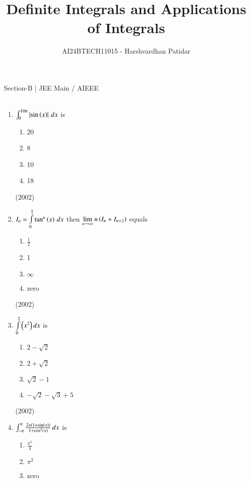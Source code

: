 \documentclass[journal,12pt,twocolumn]{IEEEtran}
\theoremstyle{remark}
\begin{document}

\vspace{3cm}

\title{Definite Integrals and Applications of Integrals}
\author{AI24BTECH11015 - Harshvardhan Patidar}
\maketitle
\newpage
\bigskip

\renewcommand{\thefigure}{\theenumi}
\renewcommand{\thetable}{\theenumi}



Section-B | JEE Main / AIEEE \\ \\
\begin{enumerate}
	\item 
		$\int_0^{10\pi} \left\vert\sin \left(x\right)\right\vert \, dx$ is  
		\begin{enumerate}
			\item 20\item 8\item 10\item 18
		\end{enumerate} 
		\hfill (2002)
	\item
		$I_n = \int \limits_{0}^{\frac{\pi}{4}} \tan^n \left(x\right) \, dx$ then $\lim \limits_{n \to \infty} n\left(I_n + I_{n+2}\right)$ equals 
				\begin{enumerate}
					\item $\frac{1}{2}$
	 				\item 1
					\item $\infty$
					\item zero
	 			\end{enumerate}
				\hfill(2002)
	\item
		$ \int \limits_0^2 \left(x^2\right)dx $ is  
			\begin{enumerate}
				\item $2-\sqrt2$
				 \item $2+\sqrt2$
				\item $\sqrt2 - 1$
				\item $-\sqrt2 - \sqrt3 + 5$
			\end{enumerate}
			\hfill (2002)
	\item 
		$ \int_{-\pi}^{\pi} \frac{2x\left(1 + \sin \left(x\right)\right)}{1+\cos^2 \left(x\right)} \, dx$ is
			\begin{enumerate}
					\item $\frac{\pi^2}{4}$
					\item $\pi^2$
					\item zero

\end{enumerate}
\end{enumerate}
\end{document}
